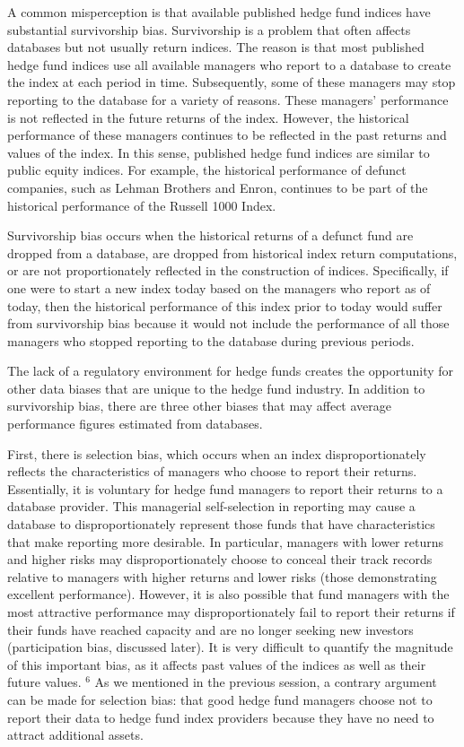 \documentclass[11pt]{article}
\begin{document}
A common misperception is that available published hedge fund indices have substantial survivorship bias. Survivorship is a problem that often affects databases but not usually return indices. The reason is that most published hedge fund indices use all available managers who report to a database to create the index at each period in time. Subsequently, some of these managers may stop reporting to the database for a variety of reasons. These managers' performance is not reflected in the future returns of the index. However, the historical performance of these managers continues to be reflected in the past returns and values of the index. In this sense, published hedge fund indices are similar to public equity indices. For example, the historical performance of defunct companies, such as Lehman Brothers and Enron, continues to be part of the historical performance of the Russell 1000 Index.

Survivorship bias occurs when the historical returns of a defunct fund are dropped from a database, are dropped from historical index return computations, or are not proportionately reflected in the construction of indices. Specifically, if one were to start a new index today based on the managers who report as of today, then the historical performance of this index prior to today would suffer from survivorship bias because it would not include the performance of all those managers who stopped reporting to the database during previous periods.

The lack of a regulatory environment for hedge funds creates the opportunity for other data biases that are unique to the hedge fund industry. In addition to survivorship bias, there are three other biases that may affect average performance figures estimated from databases.

First, there is selection bias, which occurs when an index disproportionately reflects the characteristics of managers who choose to report their returns. Essentially, it is voluntary for hedge fund managers to report their returns to a database provider. This managerial self-selection in reporting may cause a database to disproportionately represent those funds that have characteristics that make reporting more desirable. In particular, managers with lower returns and higher risks may disproportionately choose to conceal their track records relative to managers with higher returns and lower risks (those demonstrating excellent performance). However, it is also possible that fund managers with the most attractive performance may disproportionately fail to report their returns if their funds have reached capacity and are no longer seeking new investors (participation bias, discussed later). It is very difficult to quantify the magnitude of this important bias, as it affects past values of the indices as well as their future values. ${ }^{6}$ As we mentioned in the previous session, a contrary argument can be made for selection bias: that good hedge fund managers choose not to report their data to hedge fund index providers because they have no need to attract additional assets.
\end{document}
